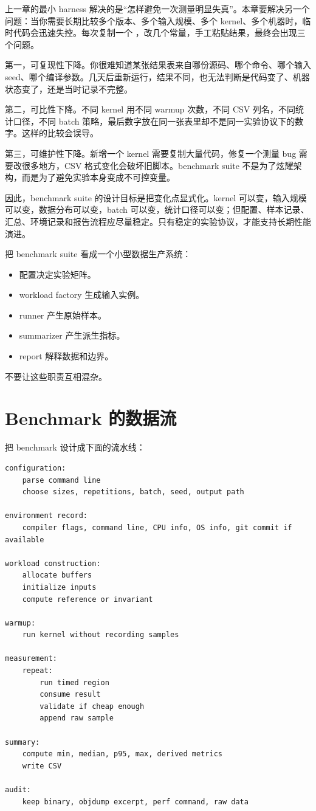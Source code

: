 上一章的最小 harness 解决的是“怎样避免一次测量明显失真”。本章要解决另一个问题：当你需要长期比较多个版本、多个输入规模、多个 kernel、多个机器时，临时代码会迅速失控。每次复制一个 ，改几个常量，手工粘贴结果，最终会出现三个问题。

第一，可复现性下降。你很难知道某张结果表来自哪份源码、哪个命令、哪个输入 seed、哪个编译参数。几天后重新运行，结果不同，也无法判断是代码变了、机器状态变了，还是当时记录不完整。

第二，可比性下降。不同 kernel 用不同 warmup 次数，不同 CSV 列名，不同统计口径，不同 batch 策略，最后数字放在同一张表里却不是同一实验协议下的数字。这样的比较会误导。

第三，可维护性下降。新增一个 kernel 需要复制大量代码，修复一个测量 bug 需要改很多地方，CSV 格式变化会破坏旧脚本。benchmark suite 不是为了炫耀架构，而是为了避免实验本身变成不可控变量。

因此，benchmark suite 的设计目标是把变化点显式化。kernel 可以变，输入规模可以变，数据分布可以变，batch 可以变，统计口径可以变；但配置、样本记录、汇总、环境记录和报告流程应尽量稳定。只有稳定的实验协议，才能支持长期性能演进。

\begin{mentalmodel}
把 benchmark suite 看成一个小型数据生产系统：

\begin{itemize}
  \item 配置决定实验矩阵。
  \item workload factory 生成输入实例。
  \item runner 产生原始样本。
  \item summarizer 产生派生指标。
  \item report 解释数据和边界。
\end{itemize}

不要让这些职责互相混杂。
\end{mentalmodel}

\section{Benchmark 的数据流}

把 benchmark 设计成下面的流水线：

\begin{lstlisting}
configuration:
    parse command line
    choose sizes, repetitions, batch, seed, output path

environment record:
    compiler flags, command line, CPU info, OS info, git commit if available

workload construction:
    allocate buffers
    initialize inputs
    compute reference or invariant

warmup:
    run kernel without recording samples

measurement:
    repeat:
        run timed region
        consume result
        validate if cheap enough
        append raw sample

summary:
    compute min, median, p95, max, derived metrics
    write CSV

audit:
    keep binary, objdump excerpt, perf command, raw data
\end{lstlisting}

